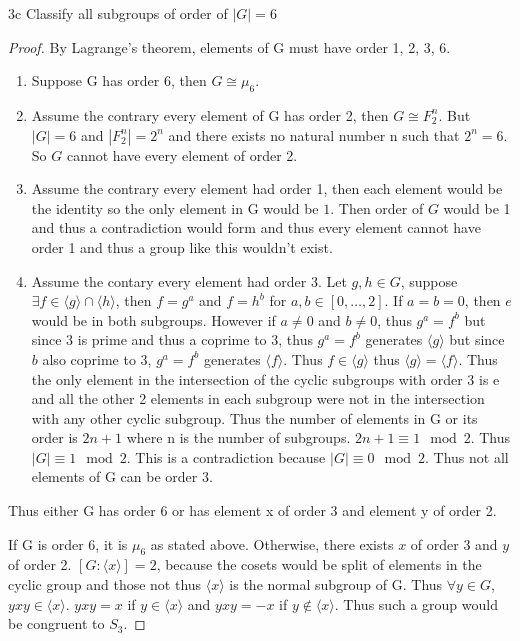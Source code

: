 \documentclass{article}
\begin{document}
\begin{claim}{3c}
    Classify all subgroups of order of $|G| = 6$
\end{claim}
\begin{proof}
    By Lagrange's theorem, elements of G must have order 1, 2, 3, 6.
    \begin{enumerate}
        \item Suppose G has order 6, then $G \cong \mu_6$.
        \item Assume the contrary every element of G has order 2, then $G \cong F_2^n$. But $|G| = 6$ and $|F_2^n| = 2^n$ and there exists no natural number n such that $2^n = 6$. So $G$ cannot have every element of order 2.
        \item Assume the contrary every element had order 1, then each element would be the identity so the only element in G would be $1$. Then order of $G$ would be 1 and thus a contradiction would form and thus every element cannot have order 1 and thus a group like this wouldn't exist.
        \item Assume the contary every element had order 3. Let $g, h \in G$, suppose $\exists f \in \langle g \rangle \cap \langle h \rangle$, then $f = g^a$ and $f = h^b$ for $a, b \in [0, \ldots, 2]$. If $a = b = 0$, then $e$ would be in both subgroups. However if $a \neq 0$ and $b \neq 0$, thus $g^a = f^b$ but since 3 is prime and thus a coprime to $3$, thus $g^a = f^b$ generates $\langle g \rangle$ but since $b$ also coprime to 3, $g^a = f^b$ generates $\langle f \rangle$. Thus $f \in \langle g \rangle$ thus $\langle g \rangle = \langle f \rangle$. Thus the only element in the intersection of the cyclic subgroups with order 3 is e and all the other 2 elements in each subgroup were not in the intersection with any other cyclic subgroup. Thus the number of elements in G or its order is $2n + 1$ where n is the number of subgroups. $2n + 1 \equiv 1 \mod 2$. Thus $|G| \equiv 1 \mod 2$. This is a contradiction because $|G| \equiv 0 \mod 2$. Thus not all elements of G can be order 3.
    \end{enumerate}

    Thus either G has order 6 or has element x of order 3 and element y of order 2.
    
    If G is order 6, it is $\mu_6$ as stated above.
    Otherwise, there exists $x$ of order 3 and $y$ of order 2. $[G : \langle x \rangle]= 2$, because the cosets would be split of elements in the cyclic group and those not thus $\langle x \rangle$ is the normal subgroup of G. Thus $\forall y \in G$, $yxy \in  \langle x \rangle$. $yxy = x$ if $y \in \langle x \rangle$ and $yxy = -x$ if $y \not \in \langle x \rangle$. Thus such a group would be congruent to $S_3$.
\end{proof}
\end{document}
